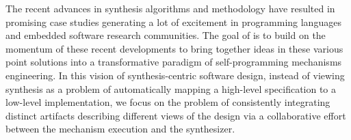 




The recent advances in synthesis algorithms and methodology have resulted in promising case studies generating a lot of excitement in programming languages and embedded software research communities. The goal of \project is to build on the momentum of these recent developments to bring together ideas in these various point solutions into a transformative paradigm of self-programming mechanisms engineering. In this vision of synthesis-centric software design, instead of viewing synthesis as a problem of automatically mapping a high-level specification to a low-level implementation, we focus on the problem of consistently integrating distinct artifacts describing different views of the design via a collaborative effort between the mechanism execution and the synthesizer.




